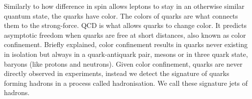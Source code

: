 Similarly to how difference in spin allows leptons to stay in an otherwise similar quantum state, the quarks have color.
The colors of quarks are what connects them to the strong-force. \ac{QCD} is what allows quarks to change color. 
It predicts asymptotic freedom when quarks are free at short distances, also known as
color confinement. Briefly explained, color confinement results in quarks never existing
in isolation but always in a quark-antiquark pair, mesons or in three quark state, baryons (like protons and neutrons). Given color confinement,
quarks are never directly observed in experiments, instead we detect the signature of quarks forming hadrons in a process
called hadronisation. We call these signature jets of hadrons. 
